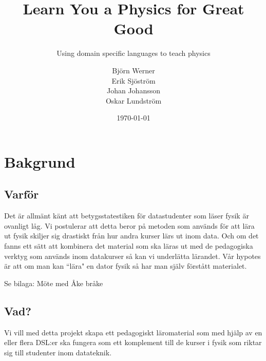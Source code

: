 \documentclass[12pt,a4paper]{scrartcl}
\begin{document}
 


\title{Learn You a Physics for Great Good}
\subtitle{Using domain specific languages to teach physics}
\date{\today}
\author{Björn Werner\\ Erik Sjöström \\ Johan Johansson \\ Oskar Lundström}

\maketitle

\newpage
\tableofcontents

\newpage
\setcounter{page}{1}

\section{Bakgrund}

\subsection{Varför}

Det är allmänt känt att betygsstatestiken för datastudenter som läser fysik är ovanligt låg. Vi postulerar att detta beror på metoden som används för att lära ut fysik skiljer sig drastiskt från hur andra kurser lärs ut inom data. Och om det fanns ett sätt att kombinera det material som ska läras ut med de pedagogiska verktyg som används inom datakurser så kan vi underlätta lärandet. Vår hypotes är att om man kan ``lära" en dator fysik så har man själv förstått materialet.

Se bilaga: Möte med Åke bråke

\subsection{Vad?}
Vi vill med detta projekt skapa ett pedagogiskt läromaterial som med hjälp av en eller flera DSL:er ska fungera som ett komplement till de kurser i fysik som riktar sig till studenter inom datateknik. 
\end{document}
